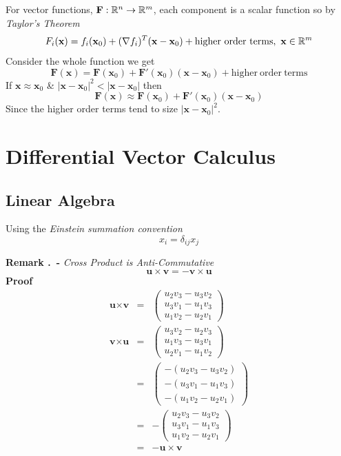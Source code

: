\documentclass[11pt,a4paper]{article}
\begin{document}
For vector functions, $\textbf{F} : \mathbb{R}^n \to \mathbb{R}^m$, each component is a scalar function so by \textit{Taylor's Theorem}
$$F_i(\textbf{x}) = f_i(\textbf{x}_0)+(\nabla f_i)^T(\textbf{x}-\textbf{x}_0) + \mathrm{higher\ order\ terms},\ \textbf{x}\in\mathbb{R}^m$$
Consider the whole function we get
$$\textbf{F}(\textbf{x})=\textbf{F}(\textbf{x}_0)+\textbf{F}'(\textbf{x}_0)(\textbf{x}-\textbf{x}_0)+\mathrm{higher\ order\ terms}$$
If $\textbf{x} \approx \textbf{x}_0$ \& $|\textbf{x}-\textbf{x}_0|^2 < |\textbf{x}-\textbf{x}_0|$ then
$$\textbf{F}(\textbf{x}) \approx \textbf{F}(\textbf{x}_0)+\textbf{F}'(\textbf{x}_0)(\textbf{x}-\textbf{x}_0)$$
Since the higher order terms tend to size $|\textbf{x}-\textbf{x}_0|^2$.
\section{Differential Vector Calculus}

\subsection{Linear Algebra}

Using the \textit{Einstein summation convention}
$$x_i=\delta_{ij}x_j$$

 \textbf{Remark .\ - }\textit{Cross Product is Anti-Commutative}
$$\textbf{u}\times\textbf{v}=-\textbf{v}\times\textbf{u}$$
\textbf{Proof}
\[\begin{array}{rcl}
\textbf{u}\times\textbf{v}&=&\begin{pmatrix}
u_2v_3-u_3v_2\\
u_3v_1-u_1v_3\\
u_1v_2-u_2v_1
\end{pmatrix}\\
\textbf{v}\times\textbf{u}&=&\begin{pmatrix}
u_3v_2-u_2v_3\\
u_1v_3-u_3v_1\\
u_2v_1-u_1v_2
\end{pmatrix}\\
&=&\begin{pmatrix}
-(u_2v_3-u_3v_2)\\
-(u_3v_1-u_1v_3)\\
-(u_1v_2-u_2v_1)
\end{pmatrix}\\
&=&-\begin{pmatrix}
u_2v_3-u_3v_2\\
u_3v_1-u_1v_3\\
u_1v_2-u_2v_1
\end{pmatrix}\\
&=&-\textbf{u}\times\textbf{v}
\end{array}\]
\end{document}
